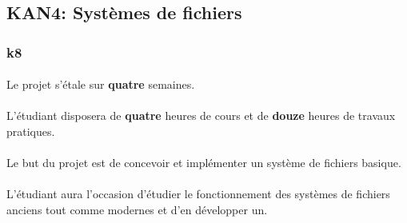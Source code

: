 \documentclass[10pt,a4wide]{article}
\begin{document}
\newpage

\subsection{KAN4: Syst\`emes de fichiers}

\paragraph{}

\subsubsection{k8}

\paragraph{}

Le projet s'\'etale sur \textbf{quatre} semaines.

\paragraph{}

L'\'etudiant disposera de \textbf{quatre} heures de cours et de \textbf{douze}
heures de travaux pratiques.

\paragraph{}

Le but du projet est de concevoir et impl\'ementer un syst\`eme de fichiers
basique.

\paragraph{}

L'\'etudiant aura l'occasion d'\'etudier le fonctionnement des syst\`emes
de fichiers anciens tout comme modernes et d'en d\'evelopper un.

\vspace{5cm}
\end{document}
